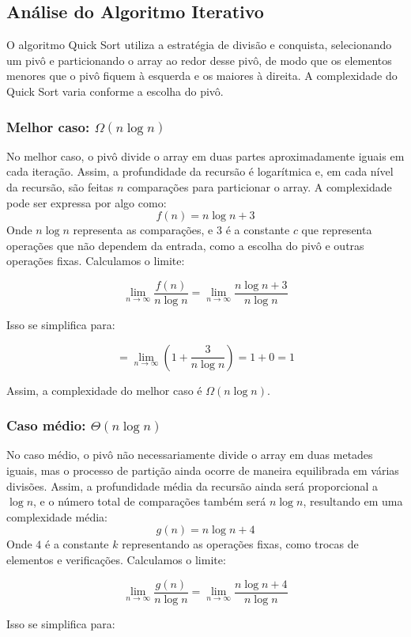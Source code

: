 \subsection{Análise do Algoritmo Iterativo}

O algoritmo Quick Sort utiliza a estratégia de divisão e conquista, selecionando um pivô e particionando o array ao redor desse pivô, de modo que os elementos menores que o pivô fiquem à esquerda e os maiores à direita. A complexidade do Quick Sort varia conforme a escolha do pivô.
\subsubsection{Melhor caso: \(\Omega(n \log n)\)}
No melhor caso, o pivô divide o array em duas partes aproximadamente iguais em cada iteração. Assim, a profundidade da recursão é logarítmica e, em cada nível da recursão, são feitas \(n\) comparações para particionar o array. A complexidade pode ser expressa por algo como:
\[
f(n) = n \log n + 3
\]
Onde \(n \log n\) representa as comparações, e \(3\) é a constante \(c\) que representa operações que não dependem da entrada, como a escolha do pivô e outras operações fixas. Calculamos o limite:

\[
\lim_{n \to \infty} \frac{f(n)}{n \log n} = \lim_{n \to \infty} \frac{n \log n + 3}{n \log n}
\]

Isso se simplifica para:

\[
= \lim_{n \to \infty} \left(1 + \frac{3}{n \log n}\right) = 1 + 0 = 1
\]

Assim, a complexidade do melhor caso é \(\Omega(n \log n)\).

\subsubsection{Caso médio: \(\Theta(n \log n)\)}
No caso médio, o pivô não necessariamente divide o array em duas metades iguais, mas o processo de partição ainda ocorre de maneira equilibrada em várias divisões. Assim, a profundidade média da recursão ainda será proporcional a \( \log n \), e o número total de comparações também será \(n \log n\), resultando em uma complexidade média:
\[
g(n) = n \log n + 4
\]
Onde \(4\) é a constante \(k\) representando as operações fixas, como trocas de elementos e verificações. Calculamos o limite:

\[
\lim_{n \to \infty} \frac{g(n)}{n \log n} = \lim_{n \to \infty} \frac{n \log n + 4}{n \log n}
\]

Isso se simplifica para:

